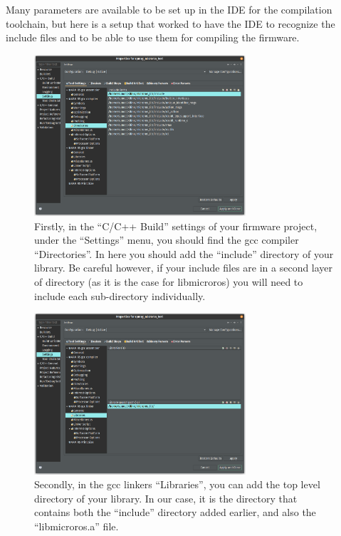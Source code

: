 \documentclass[10pt]{article}
\begin{document}
Many parameters are available to be set up in the IDE for the compilation toolchain, but here is
a setup that worked to have the IDE to recognize the include files and to be able to use them
for compiling the firmware.

\label{sec:including-micro-ros}
\begin{figure}[H]
  \centering
  \includegraphics[width=0.7\textwidth]{./img/vitis_new/include}
  \caption{Firstly, in the ``C/C++ Build'' settings of your firmware project, under the ``Settings'' menu, you should find the gcc compiler
    ``Directories''. In here you should add the ``include'' directory of your library. Be careful however, if your include files are in
  a second layer of directory (as it is the case for libmicroros) you will need to include each sub-directory individually.}
  \label{fig:include1}
\end{figure}

\begin{figure}[H]
  \centering
  \includegraphics[width=0.7\textwidth]{./img/vitis_new/include2}
  \caption{Secondly, in the gcc linkers ``Libraries'', you can add the top level directory of your library. In our case, it is the
    directory that contains both the ``include'' directory added earlier, and also the ``libmicroros.a'' file.}
  \label{fig:include2}
\end{figure}
\end{document}
